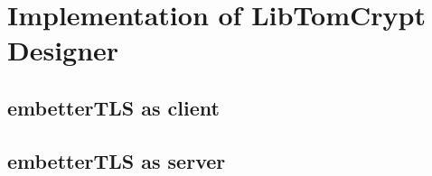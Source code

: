 \chapter{Implementation of LibTomCrypt Designer}

\section{embetterTLS as client}


\section{embetterTLS as server}

